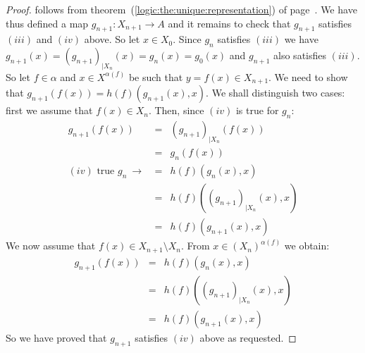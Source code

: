 \begin{proof}
follows from theorem~(\ref{logic:the:unique:representation}) of
page~\pageref{logic:the:unique:representation}. We have thus defined
a map $g_{n+1}:X_{n+1}\to A$ and it remains to check that $g_{n+1}$
satisfies $(iii)$ and $(iv)$ above. So let $x\in X_{0}$. Since
$g_{n}$ satisfies $(iii)$ we have
$g_{n+1}(x)=(g_{n+1})_{|X_{n}}(x)=g_{n}(x)=g_{0}(x)$ and $g_{n+1}$
also satisfies $(iii)$. So let $f\in\alpha$ and $x\in X^{\alpha(f)}$
be such that $y=f(x)\in X_{n+1}$. We need to show that
$g_{n+1}(f(x)) = h(f)(g_{n+1}(x),x)$. We shall distinguish two
cases: first we assume that $f(x)\in X_{n}$. Then, since $(iv)$ is
true for $g_{n}$:
    \begin{eqnarray*}
    g_{n+1}(f(x)) &=& (g_{n+1})_{|X_{n}}(f(x))\\
        &=& g_{n}(f(x))\\
        (iv)\mbox{\ true\ }g_{n}\ \rightarrow\ &=&h(f)(g_{n}(x),x)\\
        &=&h(f)((g_{n+1})_{|X_{n}}(x),x)\\
        &=&h(f)(g_{n+1}(x),x)
    \end{eqnarray*}
We now assume that $f(x)\in X_{n+1}\setminus X_{n}$. From
$x\in(X_{n})^{\alpha(f)}$ we obtain:
    \begin{eqnarray*}
    g_{n+1}(f(x))&=&h(f)(g_{n}(x),x)\\
        &=& h(f)((g_{n+1})_{|X_{n}}(x),x)\\
        &=& h(f)(g_{n+1}(x),x)
    \end{eqnarray*}
So we have proved that $g_{n+1}$ satisfies $(iv)$ above as
requested.
\end{proof}
